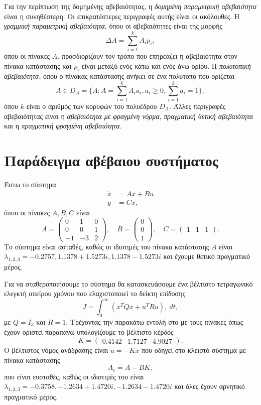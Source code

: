 Για την περίπτωση της δομημένης αβεβαιότητας, η
\emph{δομημένη παραμετρική αβεβαιότητα} είναι η συνηθέστερη. Οι επικρατέστερες
περιγραφές αυτής είναι οι ακόλουθες. Η \emph{γραμμική παραμετρική αβεβαιότητα},
όπου οι αβεβαιότητες είναι της μορφής
\[
    \Delta A = \sum_{i = 1}^k A_ip_i,
\]
όπου οι πίνακες \( A_i \) προσδιορίζουν τον τρόπο που επηρεάζει η αβεβαιότητα
στον πίνακα κατάστασης και \( p_i \) είναι μεταξύ ενός κάτω και ενός άνω ορίου.
Η \emph{πολυτοπική αβεβαιότητα}, όπου ο πίνακας κατάστασης ανήκει σε ένα
πολύτοπο που ορίζεται
\[
    A \in D_A = \{ A: A = \sum_{i = 1}^kA_ia_i, a_i \geq 0, \sum_{i = 1}^ka_i =
    1 \},
\]
όπου \( k \) είναι ο αριθμός των κορυφών του πολυέδρου \( D_A \).
Άλλες περιγραφές αβεβαιότητας είναι η \emph{αβεβαιότητα με φραγμένη νόρμα},
\emph{πραγματική θετική αβεβαιότητα} και η \emph{πραγματική φραγμένη
αβεβαιότητα}.

\section{Παράδειγμα αβέβαιου συστήματος}
Έστω το σύστημα
\begin{align*}
    \dot{x} &= Ax + Bu \\
    y &= Cx,
\end{align*}
όπου οι πίνακες \( A, B, C \) είναι
\[
    A =
    \begin{pmatrix}
        0 & 1 & 0 \\
        0 & 0 & 1 \\
        -1 & -3 & 2
    \end{pmatrix}, \quad
    B = \begin{pmatrix}0 \\ 0 \\ 1\end{pmatrix}, \quad
    C = \begin{pmatrix}1 & 1 & 1\end{pmatrix}.
\]
Το σύστημα είναι ασταθές, καθώς οι ιδιοτιμές του πίνακα κατάστασης
\( A \) είναι \( \lambda_{1,2,3} = -0.2757, 1.1378 + 1.5273i, 1.1378
- 1.5273i \) και έχουμε θετικό πραγματικό μέρος.

Για να σταθεροποιήσουμε το σύστημα θα κατασκευάσουμε ένα βέλτιστο τετραγωνικό
ελεγκτή απείρου χρόνου που ελαχιστοποιεί το δείκτη επίδοσης
\[
    J = \int_0^{\infty} \left( x^TQx + u^TRu \right) ,\ dt,
\]
με \( Q = I_3 \) και \( R = 1 \). Τρέχοντας την παρακάτω εντολή στο 
με τους πίνακες όπως έχουν οριστεί παραπάνω
υπολογίζουμε το βέλτιστο κέρδος
\[
    K = \begin{pmatrix}0.4142 & 1.7127 & 4.9027\end{pmatrix}.
\]
Ο βέλτιστος νόμος ανάδρασης είναι \( u = -Kx \) που οδηγεί στο κλειστό σύστημα
με πίνακα κατάστασης
\[
    A_c = A - BK,
\]
που είναι ευσταθές, καθώς οι ιδιοτιμές του είναι
\( \lambda_{1,2,3} = -0.3758, -1.2634 + 1.4720i,
-1.2634 - 1.4720i \) και όλες έχουν αρνητικό πραγματικό μέρος.

